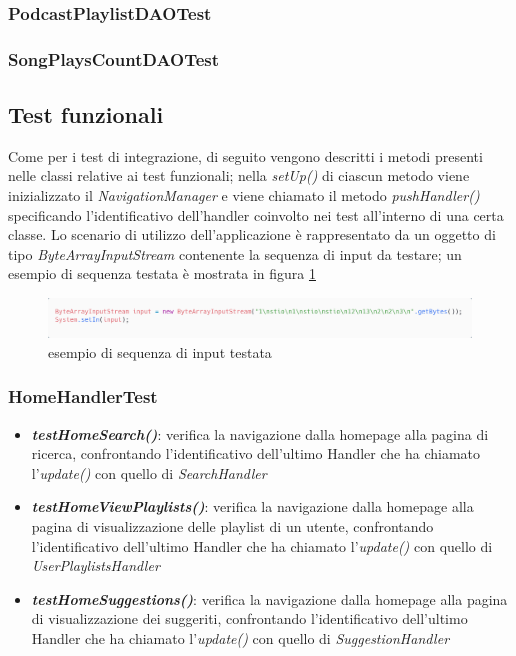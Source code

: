 \documentclass{article}
\begin{document}
  \subsubsection{PodcastPlaylistDAOTest}

  \subsubsection{SongPlaysCountDAOTest}

  \subsection{Test funzionali}

  Come per i test di integrazione, di seguito vengono descritti i metodi presenti nelle classi relative ai test funzionali; nella \textit{setUp()} di ciascun metodo viene inizializzato il \textit{NavigationManager} e viene chiamato il metodo \textit{pushHandler()} specificando l'identificativo dell'handler coinvolto nei test all'interno di una certa classe. Lo scenario di utilizzo dell'applicazione è rappresentato da un oggetto di tipo \textit{ByteArrayInputStream} contenente la sequenza di input da testare; un esempio di sequenza testata è mostrata in figura \ref{fig:testString}

  \begin{figure}[H]
    \centering
    \includegraphics[width=1\linewidth]{testString.png}
    \caption{esempio di sequenza di input testata}
    \label{fig:testString}
  \end{figure}

  \subsubsection{HomeHandlerTest}

  \begin{itemize}

    \item \textbf{\textit{testHomeSearch()}}: verifica la navigazione dalla homepage alla pagina di ricerca, confrontando l'identificativo dell'ultimo Handler che ha chiamato l'\textit{update()} con quello di \textit{SearchHandler}

    \item \textbf{\textit{testHomeViewPlaylists()}}: verifica la navigazione dalla homepage alla pagina di visualizzazione delle playlist di un utente, confrontando l'identificativo dell'ultimo Handler che ha chiamato l'\textit{update()} con quello di \textit{UserPlaylistsHandler}

    \item \textbf{\textit{testHomeSuggestions()}}: verifica la navigazione dalla homepage alla pagina di visualizzazione dei suggeriti, confrontando l'identificativo dell'ultimo Handler che ha chiamato l'\textit{update()} con quello di \textit{SuggestionHandler}

  \end{itemize}
\end{document}
